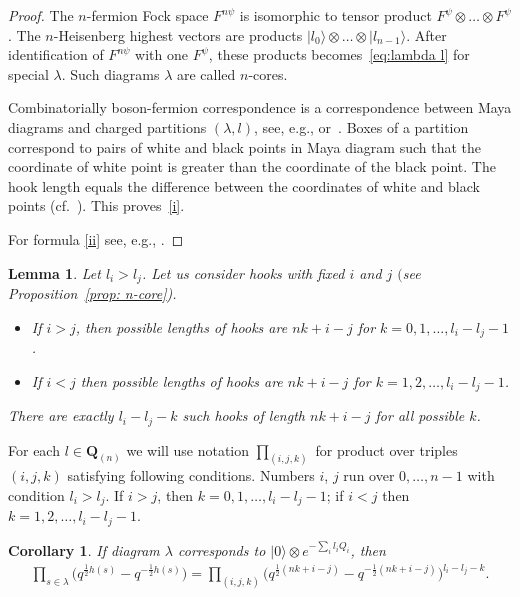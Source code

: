 \documentclass[pdftex]{sigma}
\numberwithin{equation}{section}
\newtheorem{Corollary}[Theorem]{Corollary}
\newtheorem{Lemma}[Theorem]{Lemma}
\theoremstyle{definition}
\newcommand{\vac}{|0 \rangle}
\newcommand{\Q}{\mathbf{Q}_{(n)}}
\begin{document}
\begin{proof}
The $n$-fermion Fock space $F^{n \psi}$ is isomorphic to tensor product $F^{ \psi}\otimes \dots \otimes F^{ \psi}$. The $n$-Heisenberg highest vectors are products $|l_0\rangle \otimes\dots \otimes |l_{n-1}\rangle$. After identification of $F^{n \psi}$ with one $F^{ \psi}$, these products becomes~\eqref{eq:lambda l} for special $\lambda$. Such diagrams $\lambda$ are called $n$-cores.

Combinatorially boson-fermion correspondence is a correspondence between Maya diagrams and charged partitions $(\lambda,l )$, see, e.g., \cite[Section~6.4]{Negut15} or~\cite{FM}. Boxes of a partition correspond to pairs of white and black points in Maya diagram such that the coordinate of white point is greater than the coordinate of the black point. The hook length equals the difference between the coordinates of white and black points (cf.~\cite[Section~6.4]{Negut15}). This proves~\eqref{i}.

For formula \eqref{ii} see, e.g., \cite[Proposition~2.30]{FM}.
\end{proof}

\begin{Lemma}
Let $l_i > l_j$. Let us consider hooks with fixed $i$ and $j$ $($see Proposition~{\rm \ref{prop: n-core})}.
\begin{itemize}\itemsep=0pt
\item If $i>j$, then possible lengths of hooks are $nk+i-j$ for $k= 0, 1, \dots, l_i-l_j-1$.
\item If $i<j$ then possible lengths of hooks are $nk+i-j$ for $k= 1, 2, \dots, l_i-l_j-1$.
\end{itemize}
There are exactly $l_i-l_j-k$ such hooks of length $nk + i -j$ for all possible $k$.
\end{Lemma}

For each $l \in \Q$ we will use notation $\prod\limits_{(i,j,k)}$ for product over triples $(i,j,k)$ satisfying following conditions. Numbers $i$, $j$ run over $0, \dots, n-1$ with condition $l_i>l_j$. If $i>j$, then $k= 0, 1, \dots, l_i-l_j-1$; if $i<j$ then $k= 1, 2, \dots, l_i-l_j-1$.

\begin{Corollary} \label{corol: product s ijk} If diagram $\lambda$ corresponds to $\vac \otimes e^{-\sum_i l_i Q_i}$, then
\begin{gather*}
\prod_{s\in\lambda}\big(q^{\frac12h(s)}-q^{-\frac12h(s)}\big) = \prod_{(i,j,k)} \big(q^{\frac12 (nk+i-j)}-q^{-\frac12(nk+i-j)}\big)^{l_i-l_j-k}.
\end{gather*}
\end{Corollary}
\end{document}
